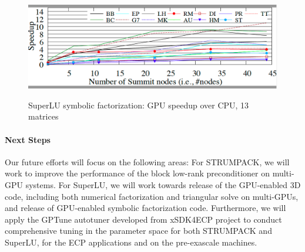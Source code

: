 \vspace{-.13in}
\begin{figure}[htb]
\centering
\includegraphics[scale=0.2]{projects/2.3.3-MathLibs/2.3.3.07-STRUMPACK-SuperLU/speedup_SOA.jpg}
\label{fig:strumpack-metis-scaling}
\caption{SuperLU symbolic factorization: GPU speedup over CPU, 13 matrices}
\end{figure}


\vspace{-.135in}
\paragraph{Next Steps} Our future efforts will focus on the following areas:
 For STRUMPACK, we will work to improve the performance of the block
 low-rank preconditioner on multi-GPU systems.
 For SuperLU, we will work towards release of the GPU-enabled 3D code, including both numerical
 factorization and triangular solve on multi-GPUs, and release of GPU-enabled symbolic
 factorization code.
 Furthermore, we will apply the GPTune autotuner developed from xSDK4ECP project to conduct comprehensive
 tuning in the parameter space for both STRUMPACK and SuperLU, for the ECP applications and
 on the pre-exascale machines.

